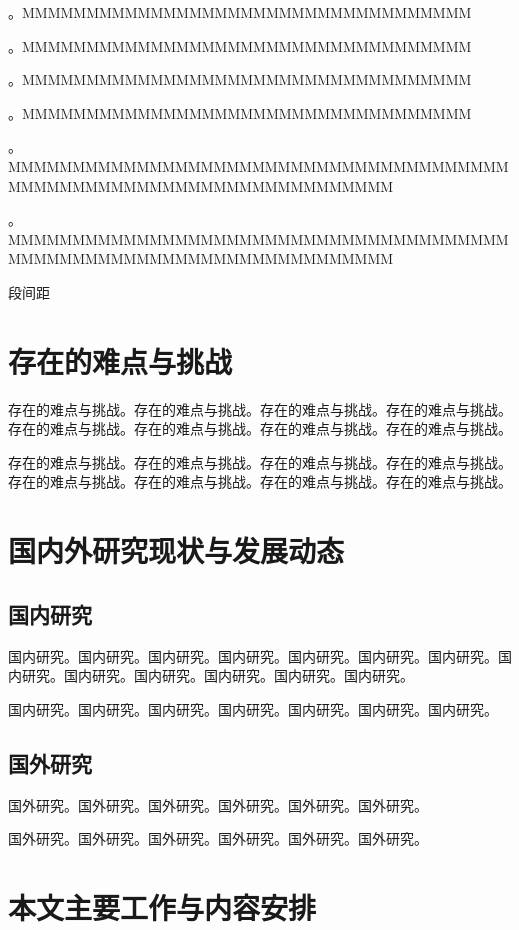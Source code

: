 \documentclass{csuthesis}
\begin{document}
    {\noindent {} 。MMMMMMMMMMMMMMMMMMMMMMMMMMMMMMMMMMM}
    
    {\noindent {} 。MMMMMMMMMMMMMMMMMMMMMMMMMMMMMMMMMMM}
    
    {\noindent {} 。MMMMMMMMMMMMMMMMMMMMMMMMMMMMMMMMMMM}
    
    {\noindent {} 。MMMMMMMMMMMMMMMMMMMMMMMMMMMMMMMMMMM}
    
    {\noindent {} 。MMMMMMMMMMMMMMMMMMMMMMMMMMMMMMMMMMMMMMMMMMMMMMMMMMMMMMMMMMMMMMMMMMMMM}
    
    {\noindent {} 。MMMMMMMMMMMMMMMMMMMMMMMMMMMMMMMMMMMMMMMMMMMMMMMMMMMMMMMMMMMMMMMMMMMMM}
    
    \noindent 段间距 \the\parskip
    
    \section{存在的难点与挑战}

    存在的难点与挑战。存在的难点与挑战。存在的难点与挑战。存在的难点与挑战。存在的难点与挑战。存在的难点与挑战。存在的难点与挑战。存在的难点与挑战。

    存在的难点与挑战。存在的难点与挑战。存在的难点与挑战。存在的难点与挑战。存在的难点与挑战。存在的难点与挑战。存在的难点与挑战。存在的难点与挑战。

    \section{国内外研究现状与发展动态}
    \subsection{国内研究}
    国内研究。国内研究。国内研究。国内研究。国内研究。国内研究。国内研究。国内研究。国内研究。国内研究。国内研究。国内研究。国内研究。

    国内研究。国内研究。国内研究。国内研究。国内研究。国内研究。国内研究。

    \subsection{国外研究}
    国外研究。国外研究。国外研究。国外研究。国外研究。国外研究。

    国外研究。国外研究。国外研究。国外研究。国外研究。国外研究。

    \section{本文主要工作与内容安排}
\end{document}
